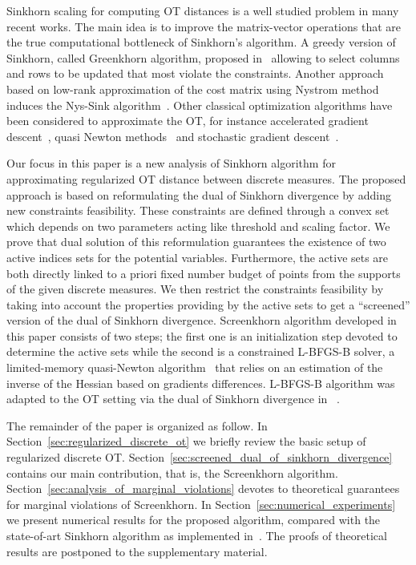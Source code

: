 Sinkhorn scaling for computing OT distances is a well studied problem in many recent works. 
The main idea is to improve the matrix-vector operations that are the true computational bottleneck of Sinkhorn’s algorithm. 
A greedy version of Sinkhorn, called Greenkhorn algorithm, proposed in~\cite{altschulernips17} allowing to select columns and rows to be updated that most violate the constraints.                   
Another approach based on low-rank approximation of the cost matrix using Nystrom method induces the Nys-Sink algorithm~\cite{altschuler2018Nystrom}. 
Other classical optimization algorithms have been considered to approximate the OT, for instance accelerated gradient descent~\cite{xie2018proxpointOT,dvurechensky18aICML,lin2019}, quasi Newton methods~\cite{blondel2018ICML,cuturi2016SIAM} and stochastic gradient descent~\cite{genevay2016stochOT,khalilabid2018}. 

Our focus in this paper is a new analysis of Sinkhorn algorithm for approximating regularized OT distance between discrete measures.
The proposed approach is based on reformulating the dual of Sinkhorn divergence by adding new constraints feasibility.
These constraints are defined through a convex set which depends on two parameters acting like threshold and scaling factor.
We prove that dual solution of this reformulation guarantees the existence of two active indices sets for the potential variables.
Furthermore, the active sets are both directly linked to a priori fixed number budget of points from the supports of the given discrete measures.
We then restrict the constraints feasibility by taking into account the properties providing by the active sets to get a ``screened'' version of the dual of Sinkhorn divergence. 
Screenkhorn algorithm developed in this paper consists of two steps; the first one is an initialization step devoted to determine the active sets while the second is a constrained L-BFGS-B solver, a limited-memory quasi-Newton algorithm~\cite{nocedal1980,nocedal2006numerical} that relies on an estimation of the inverse of the Hessian based on gradients differences. 
L-BFGS-B algorithm was adapted to the OT setting via the dual of Sinkhorn divergence in ~\cite{cuturi2016SIAM,blondel2018ICML}.

The remainder of the paper is organized as follow. In Section~\ref{sec:regularized_discrete_ot} we briefly review the basic setup of regularized discrete OT. 
Section~\ref{sec:screened_dual_of_sinkhorn_divergence} contains our main contribution, that is, the Screenkhorn algorithm. 
Section~\ref{sec:analysis_of_marginal_violations} devotes to theoretical guarantees for marginal violations of Screenkhorn. 
In Section~\ref{sec:numerical_experiments} we present numerical results for the proposed algorithm, compared with the state-of-art Sinkhorn algorithm as implemented in~\cite{flamary2017pot}. 
The proofs of theoretical results are postponed to the supplementary material.

